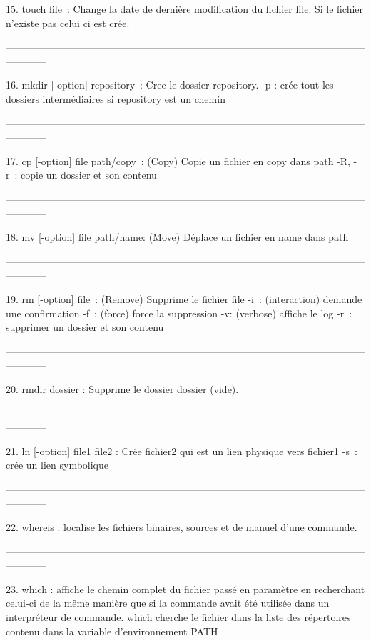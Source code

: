 \documentclass[a4paper, 10pt, onecolumn, openright, oneside]{book}
\begin{document}
    15. touch file : Change la date de dernière modification du fichier file. Si le fichier n’existe pas celui ci est crée.

------------------------------------------------------------------------------------------------------------------------

    16. mkdir [-option] repository : Cree le dossier repository.
-p : crée tout les dossiers intermédiaires si repository est un chemin

------------------------------------------------------------------------------------------------------------------------

    17. cp [-option] file path/copy : (Copy) Copie un fichier en copy dans path
-R, -r : copie un dossier et son contenu

------------------------------------------------------------------------------------------------------------------------

    18. mv  [-option] file path/name: (Move) Déplace un fichier en name dans path

------------------------------------------------------------------------------------------------------------------------

    19. rm [-option] file : (Remove) Supprime le fichier file
-i : (interaction) demande une confirmation
-f : (force) force la suppression
-v: (verbose) affiche le log
-r : supprimer un dossier et son contenu

------------------------------------------------------------------------------------------------------------------------

    20. rmdir dossier : Supprime le dossier dossier (vide). 

------------------------------------------------------------------------------------------------------------------------

    21. ln [-option] file1 file2 : Crée fichier2 qui est un lien physique vers fichier1
-s : crée un lien symbolique

------------------------------------------------------------------------------------------------------------------------

    22. whereis : localise les fichiers binaires, sources et de manuel d'une commande. 

------------------------------------------------------------------------------------------------------------------------

    23. which : affiche le chemin complet du fichier passé en paramètre en recherchant celui-ci de la même manière que si la commande avait été utilisée dans un interpréteur de commande. which cherche le fichier dans la liste des répertoires contenu dans la variable d'environnement PATH
\end{document}
